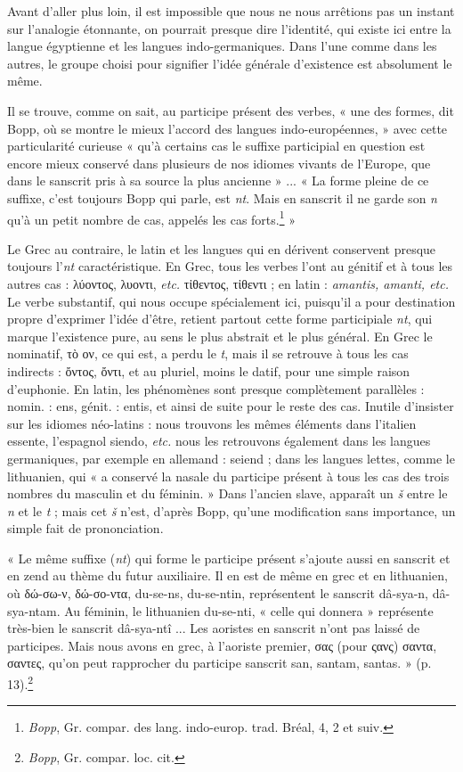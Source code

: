 \documentclass[letterpaper,twocolumn,openany,nodeprecatedcode]{dndbook}
\begin{document}
Avant d'aller plus loin, il est impossible que nous ne nous arrêtions pas un instant sur l'analogie étonnante, on pourrait presque dire l'identité, qui existe ici entre la langue égyptienne et les langues indo-germaniques. Dans l'une comme dans les autres, le groupe choisi pour signifier l'idée générale d'existence est absolument le même.

Il se trouve, comme on sait, au participe présent des verbes, « une des formes, dit Bopp, où se montre le mieux l'accord des langues indo-européennes, » avec cette particularité curieuse « qu'à certains cas le suffixe participial en question est encore mieux conservé dans plusieurs de nos idiomes vivants de l'Europe, que dans le sanscrit pris à sa source la plus ancienne » ... « La forme pleine de ce suffixe, c'est toujours Bopp qui parle, est \emph{nt}. Mais en sanscrit il ne garde son \emph{n} qu'à un petit nombre de cas, appelés les cas forts.\footnote{\emph{Bopp}, Gr. compar. des lang. indo-europ. trad. Bréal, 4, 2 et suiv.} »

Le Grec au contraire, le latin et les langues qui en dérivent conservent presque toujours l'\emph{nt} caractéristique. En Grec, tous les verbes l'ont au génitif et à tous les autres cas : λύοντος, λυοντι, \emph{etc.} τἰθεντος, τἰθεντι ; en latin : \emph{amantis, amanti, etc.} Le verbe substantif, qui nous occupe spécialement ici, puisqu'il a pour destination propre d'exprimer l'idée d'être, retient partout cette forme participiale \emph{nt}, qui marque l'existence pure, au sens le plus abstrait et le plus général. En Grec le nominatif, τὸ ον, ce qui est, a perdu le \emph{t}, mais il se retrouve à tous les cas indirects : ὄντος, ὄντι, et au pluriel, moins le datif, pour une simple raison d'euphonie. En latin, les phénomènes sont presque complètement parallèles : nomin. : ens, génit. : entis, et ainsi de suite pour le reste des cas. Inutile d'insister sur les idiomes néo-latins : nous trouvons les mêmes éléments dans l'italien essente, l'espagnol siendo, \emph{etc.} nous les retrouvons également dans les langues germaniques, par exemple en allemand : seiend ; dans les langues lettes, comme le lithuanien, qui « a conservé la nasale du participe présent à tous les cas des trois nombres du masculin et du féminin. » Dans l'ancien slave, apparaît un \emph{š} entre le \emph{n} et le \emph{t} ; mais cet \emph{š} n'est, d'après Bopp, qu'une modification sans importance, un simple fait de prononciation.

« Le même suffixe (\emph{nt}) qui forme le participe présent s'ajoute aussi en sanscrit et en zend au thème du futur auxiliaire. Il en est de même en grec et en lithuanien, où δώ-σω-ν, δώ-σο-ντα, du-se-ns, du-se-ntin, représentent le sanscrit dâ-sya-n, dâ-sya-ntam. Au féminin, le lithuanien du-se-nti, « celle qui donnera » représente très-bien le sanscrit dâ-sya-ntî ... Les aoristes en sanscrit n'ont pas laissé de participes. Mais nous avons en grec, à l'aoriste premier, σας (pour ςανς) σαντα, σαντες, qu'on peut rapprocher du participe sanscrit san, santam, santas. » (p. 13).\footnote{\emph{Bopp}, Gr. compar. loc. cit.}
\end{document}
